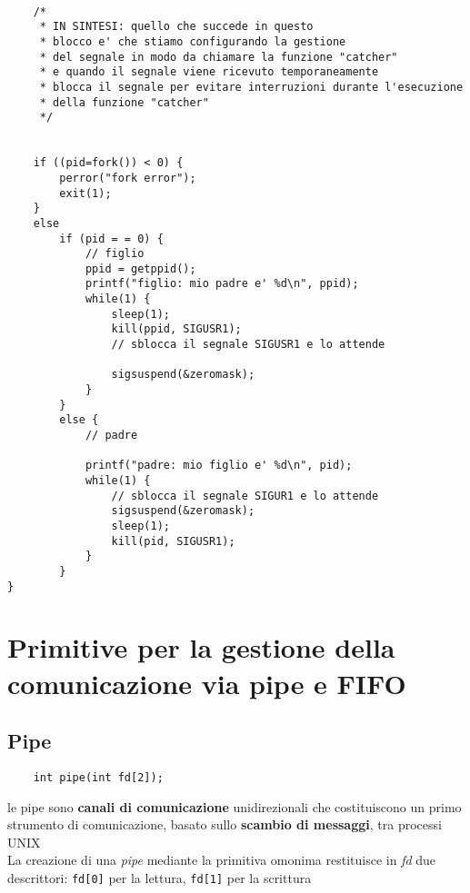 \documentclass[italian,12pt,a4paper]{article}
\begin{document}
\begin{lstlisting}[xleftmargin=-2cm]
	
	/* 
	 * IN SINTESI: quello che succede in questo
	 * blocco e' che stiamo configurando la gestione
	 * del segnale in modo da chiamare la funzione "catcher"
	 * e quando il segnale viene ricevuto temporaneamente 
	 * blocca il segnale per evitare interruzioni durante l'esecuzione
	 * della funzione "catcher"
	 */


	if ((pid=fork()) < 0) {
		perror("fork error");
		exit(1);
	}
	else
		if (pid = = 0) {
			// figlio
			ppid = getppid();
			printf("figlio: mio padre e' %d\n", ppid);
			while(1) {
				sleep(1);
				kill(ppid, SIGUSR1);
				// sblocca il segnale SIGUSR1 e lo attende
				
				sigsuspend(&zeromask);
			}
		}
		else {
			// padre
			
			printf("padre: mio figlio e' %d\n", pid);
			while(1) {
				// sblocca il segnale SIGUR1 e lo attende
				sigsuspend(&zeromask);
				sleep(1);
				kill(pid, SIGUSR1);
			}
		}
}
\end{lstlisting}

\section{Primitive per la gestione della comunicazione via pipe e FIFO}
\subsection{Pipe}
\begin{verbatim}
	int pipe(int fd[2]);
\end{verbatim}
le pipe sono \textbf{canali di comunicazione} unidirezionali che costituiscono un primo strumento di comunicazione, basato sullo \textbf{scambio di messaggi}, tra processi UNIX\\
La creazione di una \textit{pipe} mediante la primitiva omonima restituisce in \textit{fd} due descrittori: \verb|fd[0]| per la lettura, \verb|fd[1]| per la scrittura
\end{document}

